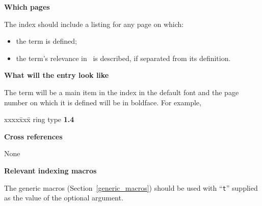 \documentclass[11pt]{article}
\newenvironment{indexex}{\begin{tabbing}
xxxx\=xxx\=\kill}{\end{tabbing}}
\begin{document}
\begin{description}
   \item{\bf Which pages}

         The index should include a listing for any page on which:
           \begin{itemize}
                \item the term is defined;
                \item the term's relevance in \cgal\ is described,
                      if separated from its definition.
           \end{itemize}
   \item{\bf What will the entry look like}

        The term will be a main item in the index in the default font 
        and the page number on which it is defined will be in boldface.
        For example,
        \begin{indexex}
        ring type               {\bf   1.4}
        \end{indexex}
   \item{\bf Cross references} 

         None 

   \item {\bf Relevant indexing macros}

         The generic macros (Section~\ref{generic_macros}) should be used 
         with ``{\tt t}'' supplied as the value of the optional argument.

\end{description}
\end{document}

